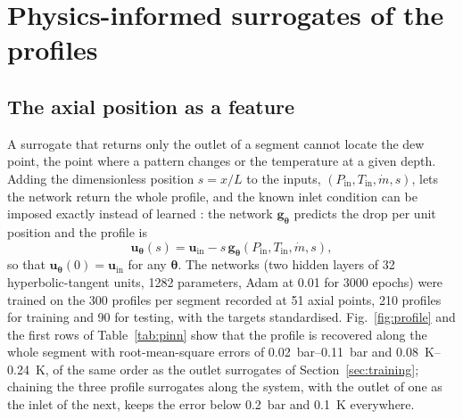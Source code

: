 \documentclass[a4paper,fleqn]{cas-sc}
\newcommand{\mdot}{\dot{m}}
\newcommand{\bu}{\mathbf{u}}
\newcommand{\btheta}{\boldsymbol{\theta}}
\begin{document}
\begin{table}[htbp]
\caption{Chained surrogate against the physical model at the segment boundaries.}\label{tab:chain}
\footnotesize


\end{table}

\begin{table}[htbp]
\caption{Evaluation cost of the physical model and of the chained surrogate.}\label{tab:speed}
\footnotesize


\end{table}

\section{Physics-informed surrogates of the profiles}\label{sec:pinn}

\subsection{The axial position as a feature}\label{sec:profile}

A surrogate that returns only the outlet of a segment cannot locate the dew point, the point where a pattern changes or the temperature at a given depth. Adding the dimensionless position $s = x/L$ to the inputs, $(P_\mathrm{in}, T_\mathrm{in}, \mdot, s)$, lets the network return the whole profile, and the known inlet condition can be imposed exactly instead of learned \citep{lagaris1998}: the network $\mathbf{g}_{\btheta}$ predicts the drop per unit position and the profile is
\begin{equation}\label{eq:profile}
\bu_{\btheta}(s) = \bu_\mathrm{in} - s\,\mathbf{g}_{\btheta}(P_\mathrm{in}, T_\mathrm{in}, \mdot, s),
\end{equation}
so that $\bu_{\btheta}(0) = \bu_\mathrm{in}$ for any $\btheta$. The networks (two hidden layers of 32 hyperbolic-tangent units, 1282 parameters, Adam at 0.01 for 3000 epochs) were trained on the 300 profiles per segment recorded at 51 axial points, 210 profiles for training and 90 for testing, with the targets standardised. Fig.~\ref{fig:profile} and the first rows of Table~\ref{tab:pinn} show that the profile is recovered along the whole segment with root-mean-square errors of \SIrange{0.02}{0.11}{\bar} and \SIrange{0.08}{0.24}{\kelvin}, of the same order as the outlet surrogates of Section~\ref{sec:training}; chaining the three profile surrogates along the system, with the outlet of one as the inlet of the next, keeps the error below \SI{0.2}{\bar} and \SI{0.1}{\kelvin} everywhere.
\end{document}
